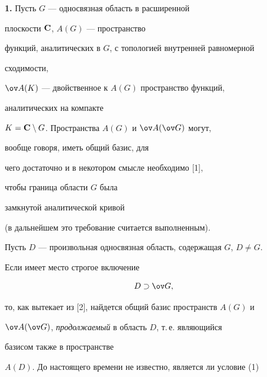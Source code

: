 \pagestyle{plain} %


 




\maketitle 


\label{begin} 


 


{\bf 1.} Пусть $G$ --- односвязная область в расширенной 


плоскости $\bold C$, $A(G)$ --- пространство 


функций, аналитических в $G$, с топологией внутренней равномерной 


сходимости, 


$\ov A(K)$ --- двойственное к $A(G)$ пространство функций, 


аналитических на компакте 


$K=\bold C\setminus G$. Пространства $A(G)$ и $\ov A(\ov G)$ могут, 


вообще говоря, иметь общий базис, для 


чего достаточно и в некотором смысле необходимо [1], 


чтобы граница области $G$ была 


замкнутой аналитической кривой 


(в дальнейшем это требование считается выполненным). 


 


Пусть $D$ --- произвольная односвязная область, содержащая $G$, $D\ne 


G$. 


Если имеет место строгое включение 


\begin{equation} 


D\supset\ov G, 


\end{equation} 


то, как вытекает из [2], найдется общий базис пространств $A(G)$ и 


$\ov A(\ov G)$, {\it продолжаемый} в область $D$, т.\,е. являющийся 


базисом также в пространстве 


$A(D)$. До настоящего времени не известно, является ли условие (1) 


